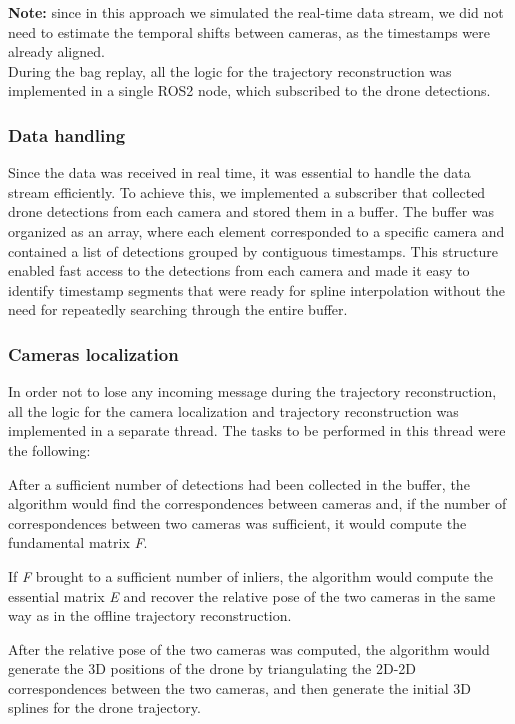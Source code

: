 \documentclass[11pt]{article}
\begin{document}
\textbf{Note:} since in this approach we simulated the real-time data stream, we did not need to estimate the temporal shifts between cameras, as the timestamps were already aligned.\\

During the bag replay, all the logic for the trajectory reconstruction was implemented in a single ROS2 node, which subscribed to the drone detections.

\subsubsection{Data handling}

Since the data was received in real time, it was essential to handle the data stream efficiently. To achieve this, we implemented a subscriber that collected drone detections from each camera and stored them in a buffer. The buffer was organized as an array, where each element corresponded to a specific camera and contained a list of detections grouped by contiguous timestamps. This structure enabled fast access to the detections from each camera and made it easy to identify timestamp segments that were ready for spline interpolation without the need for repeatedly searching through the entire buffer.

\subsubsection{Cameras localization}

In order not to lose any incoming message during the trajectory reconstruction, all the logic for the camera localization and trajectory reconstruction was implemented in a separate thread. The tasks to be performed in this thread were the following:

After a sufficient number of detections had been collected in the buffer, the algorithm would find the correspondences between cameras and, if the number of correspondences between two cameras was sufficient, it would compute the fundamental matrix \textit{F}.

If \textit{F} brought to a sufficient number of inliers, the algorithm would compute the essential matrix \textit{E} and recover the relative pose of the two cameras in the same way as in the offline trajectory reconstruction.

After the relative pose of the two cameras was computed, the algorithm would generate the 3D positions of the drone by triangulating the 2D-2D correspondences between the two cameras, and then generate the initial 3D splines for the drone trajectory.
\end{document}
